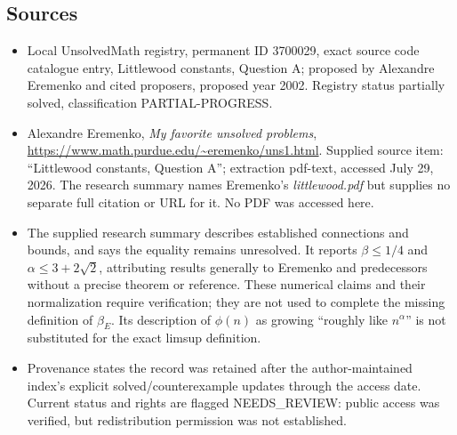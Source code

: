 \documentclass[11pt]{article}
\begin{document}
\subsection{Sources}
\begin{itemize}
\item Local UnsolvedMath registry, permanent ID 3700029, exact source code catalogue entry, Littlewood constants, Question A; proposed by Alexandre Eremenko and cited proposers, proposed year 2002. Registry status partially solved, classification PARTIAL-PROGRESS.
\item Alexandre Eremenko, \emph{My favorite unsolved problems}, \url{https://www.math.purdue.edu/~eremenko/uns1.html}. Supplied source item: ``Littlewood constants, Question A''; extraction pdf-text, accessed July 29, 2026. The research summary names Eremenko's \emph{littlewood.pdf} but supplies no separate full citation or URL for it. No PDF was accessed here.
\item The supplied research summary describes established connections and bounds, and says the equality remains unresolved. It reports $\beta\leq1/4$ and $\alpha\leq3+2\sqrt2$, attributing results generally to Eremenko and predecessors without a precise theorem or reference. These numerical claims and their normalization require verification; they are not used to complete the missing definition of $\beta_E$. Its description of $\phi(n)$ as growing ``roughly like $n^\alpha$'' is not substituted for the exact limsup definition.
\item Provenance states the record was retained after the author-maintained index's explicit solved/counterexample updates through the access date. Current status and rights are flagged NEEDS\_REVIEW: public access was verified, but redistribution permission was not established.
\end{itemize}
\end{document}
